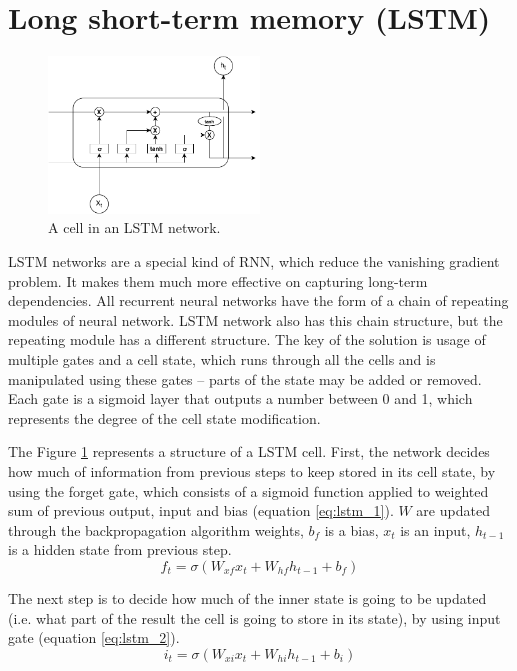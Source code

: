 \section{Long short-term memory (LSTM)} 

\begin{figure}[hbt]
  \centering
  \includegraphics[width=0.5\textwidth]{figures/lstmCell.pdf}
  \caption{A cell in an LSTM network.}
  \label{lstm}
\end{figure}

LSTM networks are a special kind of RNN, which reduce the vanishing gradient problem. It makes them much more effective on capturing long-term dependencies. All recurrent neural networks have the form of a chain of repeating modules of neural network. LSTM network also has this chain structure, but the repeating module has a different structure. The key of the solution is usage of multiple gates and a cell state, which runs through all the cells and is manipulated using these gates – parts of the state may be added or removed. Each gate is a sigmoid layer that outputs a number between 0 and 1, which represents the degree of the cell state modification.

The Figure \ref{lstm} represents a structure of a LSTM cell. First, the network decides how much of information from previous steps to keep stored in its cell state, by using the forget gate, which consists of a sigmoid function applied to weighted sum of previous output, input and bias (equation \ref{eq:lstm_1}). $W$ are updated through the backpropagation algorithm weights, $b_f$ is a bias, $x_t$ is an input, $h_{t-1}$ is a hidden state from previous step.
\begin{equation} \label{eq:lstm_1}
f_t = \sigma(W_{xf}x_t + W_{hf}h_{t-1}+b_f)
\end{equation}

The next step is to decide how much of the inner state is going to be updated (i.e. what part of the result the cell is going to store in its state), by using input gate (equation \ref{eq:lstm_2}).
\begin{equation} \label{eq:lstm_2}
i_t = \sigma(W_{xi}x_t + W_{hi}h_{t-1}+b_i)
\end{equation}

